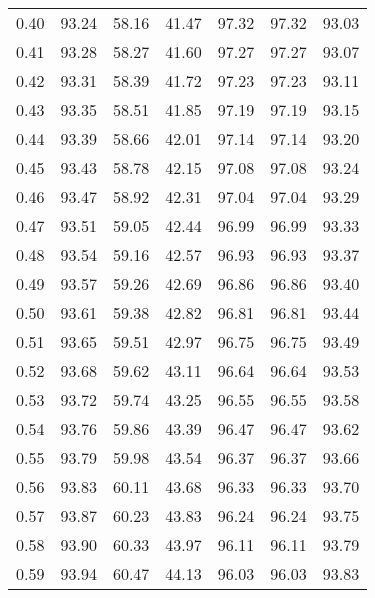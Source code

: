 \begin{tabular}{|c|c|c|c|c|c|c|}
      0.40 &     93.24 &     58.16 &      41.47 &   97.32 &      97.32 &         93.03 \\
      0.41 &     93.28 &     58.27 &      41.60 &   97.27 &      97.27 &         93.07 \\
      0.42 &     93.31 &     58.39 &      41.72 &   97.23 &      97.23 &         93.11 \\
      0.43 &     93.35 &     58.51 &      41.85 &   97.19 &      97.19 &         93.15 \\
      0.44 &     93.39 &     58.66 &      42.01 &   97.14 &      97.14 &         93.20 \\
      0.45 &     93.43 &     58.78 &      42.15 &   97.08 &      97.08 &         93.24 \\
      0.46 &     93.47 &     58.92 &      42.31 &   97.04 &      97.04 &         93.29 \\
      0.47 &     93.51 &     59.05 &      42.44 &   96.99 &      96.99 &         93.33 \\
      0.48 &     93.54 &     59.16 &      42.57 &   96.93 &      96.93 &         93.37 \\
      0.49 &     93.57 &     59.26 &      42.69 &   96.86 &      96.86 &         93.40 \\
      0.50 &     93.61 &     59.38 &      42.82 &   96.81 &      96.81 &         93.44 \\
      0.51 &     93.65 &     59.51 &      42.97 &   96.75 &      96.75 &         93.49 \\
      0.52 &     93.68 &     59.62 &      43.11 &   96.64 &      96.64 &         93.53 \\
      0.53 &     93.72 &     59.74 &      43.25 &   96.55 &      96.55 &         93.58 \\
      0.54 &     93.76 &     59.86 &      43.39 &   96.47 &      96.47 &         93.62 \\
      0.55 &     93.79 &     59.98 &      43.54 &   96.37 &      96.37 &         93.66 \\
      0.56 &     93.83 &     60.11 &      43.68 &   96.33 &      96.33 &         93.70 \\
      0.57 &     93.87 &     60.23 &      43.83 &   96.24 &      96.24 &         93.75 \\
      0.58 &     93.90 &     60.33 &      43.97 &   96.11 &      96.11 &         93.79 \\
      0.59 &     93.94 &     60.47 &      44.13 &   96.03 &      96.03 &         93.83 \\

\end{tabular}
